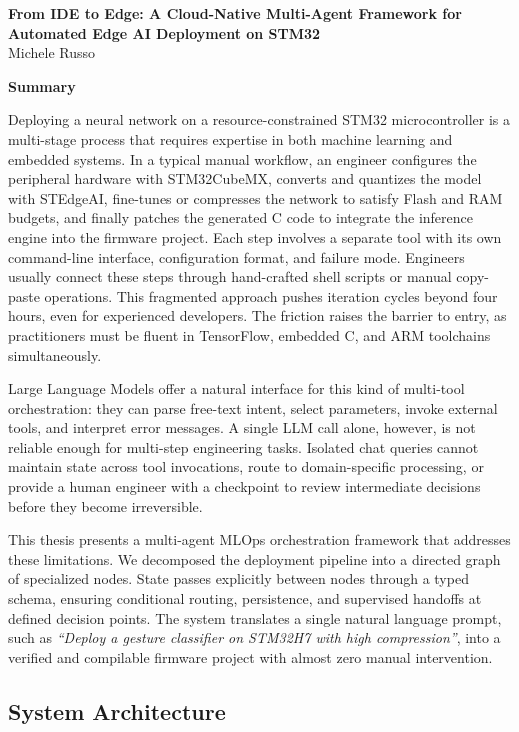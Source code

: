 \documentclass[11pt]{article}
\begin{document}
\begin{center}
    {\Large \textbf{From IDE to Edge: A Cloud-Native Multi-Agent Framework for Automated Edge AI Deployment on STM32}}\\[0.2cm]
    {\normalsize Michele Russo}
\end{center}

\vspace{0.3cm}
\textbf{Summary}

Deploying a neural network on a resource-constrained STM32 microcontroller is a multi-stage process that requires expertise in both machine learning and embedded systems. In a typical manual workflow, an engineer configures the peripheral hardware with STM32CubeMX, converts and quantizes the model with STEdgeAI, fine-tunes or compresses the network to satisfy Flash and RAM budgets, and finally patches the generated C code to integrate the inference engine into the firmware project. Each step involves a separate tool with its own command-line interface, configuration format, and failure mode. Engineers usually connect these steps through hand-crafted shell scripts or manual copy-paste operations. This fragmented approach pushes iteration cycles beyond four hours, even for experienced developers. The friction raises the barrier to entry, as practitioners must be fluent in TensorFlow, embedded C, and ARM toolchains simultaneously.

Large Language Models offer a natural interface for this kind of multi-tool orchestration: they can parse free-text intent, select parameters, invoke external tools, and interpret error messages. A single LLM call alone, however, is not reliable enough for multi-step engineering tasks. Isolated chat queries cannot maintain state across tool invocations, route to domain-specific processing, or provide a human engineer with a checkpoint to review intermediate decisions before they become irreversible.

This thesis presents a multi-agent MLOps orchestration framework that addresses these limitations. We decomposed the deployment pipeline into a directed graph of specialized nodes. State passes explicitly between nodes through a typed schema, ensuring conditional routing, persistence, and supervised handoffs at defined decision points. The system translates a single natural language prompt, such as \textit{``Deploy a gesture classifier on STM32H7 with high compression''}, into a verified and compilable firmware project with almost zero manual intervention.

\subsection*{System Architecture}
\end{document}
